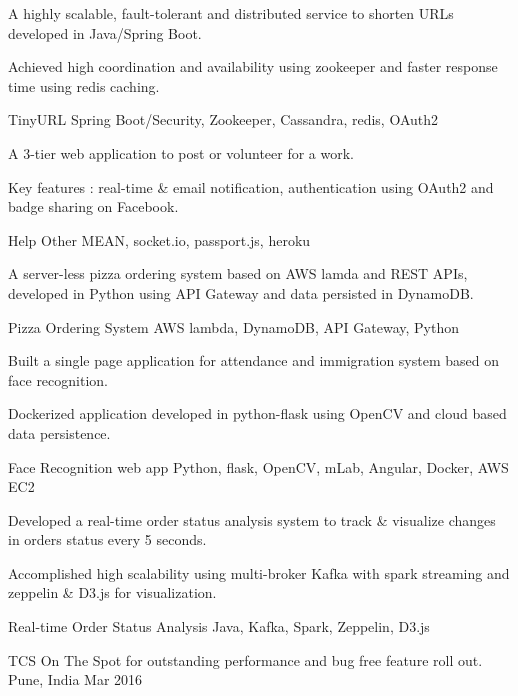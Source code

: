 \documentclass[]{awesome-cv}
\begin{document}
\vspace{-11mm}
\begin{cventries}
	\cvprojectentry
	{
	\begin{cvitems}
    	\item {A highly scalable, fault-tolerant and distributed service to shorten URLs developed in Java/Spring Boot. }
    	\item {Achieved high coordination and availability using zookeeper and faster response time using redis caching.}
	\end{cvitems}
	}
	{TinyURL}
	{Spring Boot/Security, Zookeeper, Cassandra, redis, OAuth2}
	\cvprojectentry
	{
	\begin{cvitems}
    	\item {A 3-tier web application to post or volunteer for a work.}
    	\item {Key features : real-time \& email notification, authentication using OAuth2 and badge sharing on Facebook.}
	\end{cvitems}
	}
	{Help Other}
	{MEAN, socket.io, passport.js, heroku}
	\cvprojectentry
	{
	\begin{cvitems}
    	\item {A server-less pizza ordering system based on AWS lamda and REST APIs, developed in Python using API Gateway and data persisted in DynamoDB.}
	\end{cvitems}
	}
	{Pizza Ordering System}
	{AWS lambda, DynamoDB, API Gateway, Python}
	\cvprojectentry
	{
	\begin{cvitems}
    	\item {Built a single page application for attendance and immigration system based on face recognition.}
    	\item {Dockerized application developed in python-flask using OpenCV and cloud based data persistence.}
	\end{cvitems}
	}
	{Face Recognition web app}
	{Python, flask, OpenCV, mLab, Angular, Docker, AWS EC2}
	\cvprojectentry
	{
	\begin{cvitems}
    	\item {Developed a real-time order status analysis system to track \& visualize changes in orders status every 5 seconds.}
    	\item {Accomplished high scalability using multi-broker Kafka with spark streaming and zeppelin \& D3.js for visualization.}
	\end{cvitems}
	}
	{Real-time Order Status Analysis}
	{Java, Kafka, Spark, Zeppelin, D3.js}
    \vspace{-2mm}
\end{cventries}
\vspace{-3mm}
\begin{cvhonors}
	\cvhonor
	{TCS On The Spot}
	{for outstanding performance and bug free feature roll out.}
	{Pune, India}
	{Mar 2016}
\end{cvhonors}
\ 
\end{document}
